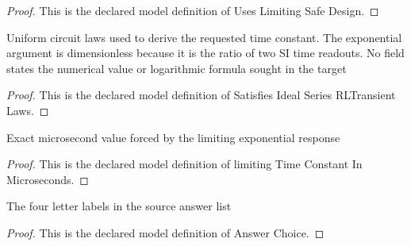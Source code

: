 \begin{proof}
  This is the declared model definition of Uses Limiting Safe Design.
\end{proof}
\begin{definition}
  \label{def:physics:phyx-mini-0941:phyxminiproblems-problemphyxmini0941-satisfiesidealseriesrltransientlaws}
  Uniform circuit laws used to derive the requested time constant. The exponential argument is dimensionless because it is the ratio of two SI time readouts. No field states the numerical value or logarithmic formula sought in the target
\end{definition}
\begin{proof}
  This is the declared model definition of Satisfies Ideal Series RLTransient Laws.
\end{proof}
\begin{definition}
  \label{def:physics:phyx-mini-0941:phyxminiproblems-problemphyxmini0941-limitingtimeconstantinmicroseconds}
  Exact microsecond value forced by the limiting exponential response
\end{definition}
\begin{proof}
  This is the declared model definition of limiting Time Constant In Microseconds.
\end{proof}
\begin{definition}
  \label{def:physics:phyx-mini-0941:phyxminiproblems-problemphyxmini0941-answerchoice}
  The four letter labels in the source answer list
\end{definition}
\begin{proof}
  This is the declared model definition of Answer Choice.
\end{proof}
